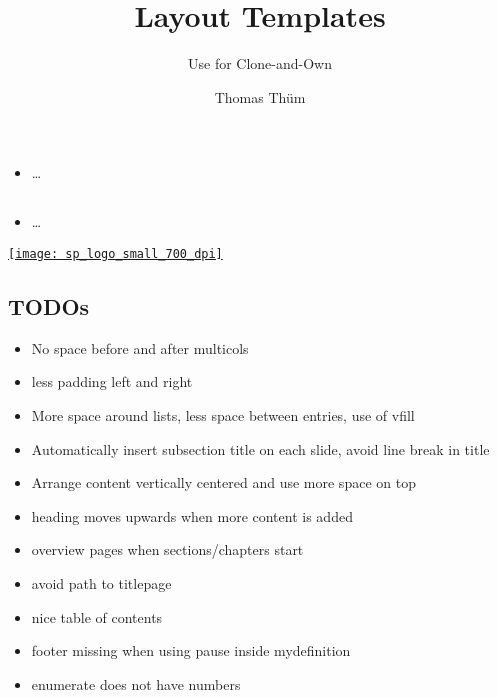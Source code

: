 
\newcommand{\insertuulmtitle}{}
\graphicspath{{pics/}}

\author{Thomas Thüm}
\title{Layout Templates}
\subtitle{Use for Clone-and-Own}



\insertuulmtitle

\subsection{}
\begin{frame}{\insertsubsection}
	\begin{itemize}
		\item \ldots
	\end{itemize}
\end{frame}

\subsection{}
\begin{frame}{\insertsubsection}
	\begin{multicols}{2}
		\begin{itemize}
			\item \ldots
		\end{itemize}
		
		\begin{center}
			\href{}{\texttt{[image: sp\_logo\_small\_700\_dpi]}}
		\end{center}
	\end{multicols}
\end{frame}

\subsection{TODOs}
\begin{frame}{\insertsubsection}
	\begin{itemize}
		\item No space before and after multicols
		\item less padding left and right
		\item More space around lists, less space between entries, use of vfill
		\item Automatically insert subsection title on each slide, avoid line break in title
		\item Arrange content vertically centered and use more space on top
		\item heading moves upwards when more content is added
		\item overview pages when sections/chapters start
		\item avoid path to titlepage
		\item nice table of contents
		\item footer missing when using pause inside mydefinition
		\item enumerate does not have numbers
	\end{itemize}
\end{frame}

